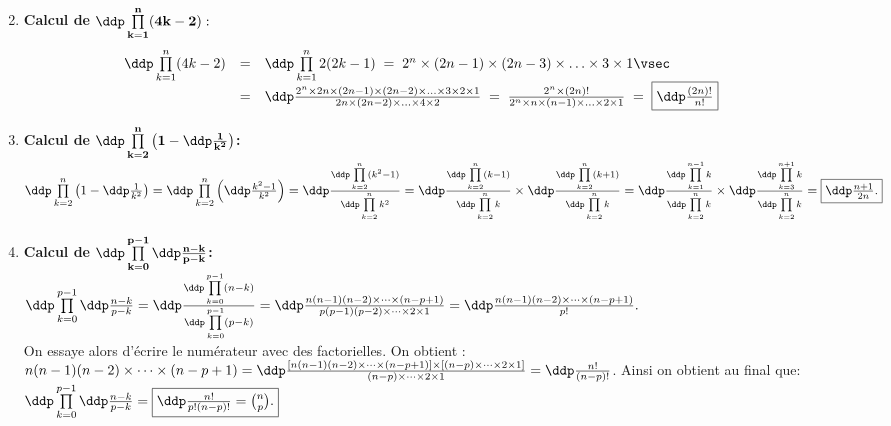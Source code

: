 \begin{correction}
\begin{enumerate}
$$\begin{array}{lll}
\end{array}$$
\item  \textbf{Calcul de $\mathbf{\ddp \prod\limits_{k=1}^n (4k-2)}:$} \\
$$\begin{array}{lll}
\hspace*{-1cm}\ddp \prod\limits_{k=1}^n (4k-2) &= & \ddp \prod\limits_{k=1}^n 2(2k-1) \; = \; 2^n \times  (2n-1)\times(2n-3) \times \ldots \times 3\times1 \vsec\\
& = & \ddp \frac{2^n \times2n \times (2n-1) \times (2n-2) \times \ldots \times 3 \times 2 \times 1}{2n \times (2n-2) \times \ldots \times 4 \times 2} \;= \;  \frac{2^n \times (2n)!}{2^n\times n \times (n-1) \times \ldots \times 2 \times 1} \; = \; \fbox{$\ddp \frac{(2n)!}{n!}$}
\end{array}$$
\item  \textbf{Calcul de $\mathbf{\ddp \prod\limits_{k=2}^n \left(  1-\ddp\frac{1}{k^2} \right)}$:}\\
\noindent $\ddp \prod\limits_{k=2}^n \left(  1-\ddp\frac{1}{k^2} \right)=\ddp \prod\limits_{k=2}^n \left(  \ddp\frac{k^2-1}{k^2} \right)=\ddp\frac{ \ddp \prod\limits_{k=2}^n (k^2-1)  }{\ddp \prod\limits_{k=2}^n k^2}=\ddp\frac{\ddp \prod\limits_{k=2}^n (k-1)}{\ddp \prod\limits_{k=2}^n k }\times \ddp\frac{\ddp \prod\limits_{k=2}^n (k+1)}{\ddp \prod\limits_{k=2}^n k }=\ddp\frac{\ddp \prod\limits_{k=1}^{n-1} k}{\ddp \prod\limits_{k=2}^n k }\times \ddp\frac{\ddp \prod\limits_{k=3}^{n+1} k}{\ddp \prod\limits_{k=2}^n k }=\fbox{$\ddp\frac{n+1}{2n}$.}$
\item  \textbf{Calcul de $\mathbf{\ddp \prod\limits_{k=0}^{p-1} \ddp\frac{n-k}{p-k}}$:}\\
\noindent 
$\ddp \prod\limits_{k=0}^{p-1} \ddp\frac{n-k}{p-k}=\ddp\frac{ \ddp \prod\limits_{k=0}^{p-1} (n-k)  }{\ddp \prod\limits_{k=0}^{p-1} (p-k)}
=\ddp\frac{n(n-1)(n-2)\times \dots \times (n-p+1)}{p(p-1)(p-2)\times \dots \times 2\times 1}=
\ddp\frac{n(n-1)(n-2)\times \dots \times (n-p+1)}{p!}.$ \\
On essaye alors d'\'ecrire le num\'erateur avec des factorielles. On obtient :
$n(n-1)(n-2)\times \dots \times (n-p+1)=\ddp\frac{ \left\lbrack n(n-1)(n-2)\times \dots \times (n-p+1) \right\rbrack \times \lbrack     (n-p)\times \dots \times 2\times 1\rbrack}{(n-p)\times \dots \times 2\times 1}=\ddp\frac{n!}{(n-p)!}$. Ainsi on obtient au final que: 
$\ddp \prod\limits_{k=0}^{p-1} \ddp\frac{n-k}{p-k}=\fbox{$\ddp\frac{n!}{p!(n-p)!}=\binom{n}{p}$.}$
\end{enumerate}
\end{correction}